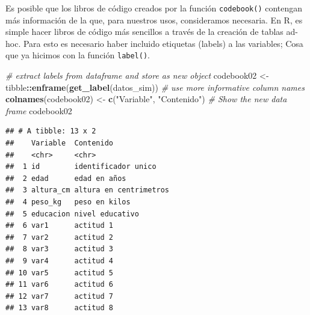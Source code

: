 \documentclass[
]{book}
\newenvironment{Shaded}{\begin{snugshade}}{\end{snugshade}}
\newcommand{\CommentTok}[1]{\textcolor[rgb]{0.56,0.35,0.01}{\textit{#1}}}
\newcommand{\FunctionTok}[1]{\textcolor[rgb]{0.13,0.29,0.53}{\textbf{#1}}}
\newcommand{\NormalTok}[1]{#1}
\newcommand{\OtherTok}[1]{\textcolor[rgb]{0.56,0.35,0.01}{#1}}
\newcommand{\SpecialCharTok}[1]{\textcolor[rgb]{0.81,0.36,0.00}{\textbf{#1}}}
\newcommand{\StringTok}[1]{\textcolor[rgb]{0.31,0.60,0.02}{#1}}
\begin{document}
Es posible que los libros de código creados por la función \texttt{codebook()} contengan más información de la que, para nuestros usos, consideramos necesaria. En R, es simple hacer libros de código más sencillos a través de la creación de tablas ad-hoc. Para esto es necesario haber incluido etiquetas (labels) a las variables; Cosa que ya hicimos con la función \texttt{label()}.

\begin{Shaded}
\begin{Highlighting}[]
\CommentTok{\# extract labels from dataframe and store as new object}
\NormalTok{codebook02 }\OtherTok{\textless{}{-}}\NormalTok{ tibble}\SpecialCharTok{::}\FunctionTok{enframe}\NormalTok{(}\FunctionTok{get\_label}\NormalTok{(datos\_sim))}
\CommentTok{\# use more informative column names}
\FunctionTok{colnames}\NormalTok{(codebook02) }\OtherTok{\textless{}{-}} \FunctionTok{c}\NormalTok{(}\StringTok{"Variable"}\NormalTok{, }\StringTok{"Contenido"}\NormalTok{)}
\CommentTok{\# Show the new data frame}
\NormalTok{codebook02}
\end{Highlighting}
\end{Shaded}

\begin{verbatim}
## # A tibble: 13 x 2
##    Variable  Contenido             
##    <chr>     <chr>                 
##  1 id        identificador unico   
##  2 edad      edad en años          
##  3 altura_cm altura en centrimetros
##  4 peso_kg   peso en kilos         
##  5 educacion nivel educativo       
##  6 var1      actitud 1             
##  7 var2      actitud 2             
##  8 var3      actitud 3             
##  9 var4      actitud 4             
## 10 var5      actitud 5             
## 11 var6      actitud 6             
## 12 var7      actitud 7             
## 13 var8      actitud 8
\end{verbatim}
\end{document}
